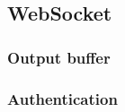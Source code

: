 \subsectionfont{\fontsize{14}{14}\selectfont}

\subsection{WebSocket}

\subsubsection{Output buffer}

\subsubsection{Authentication}
